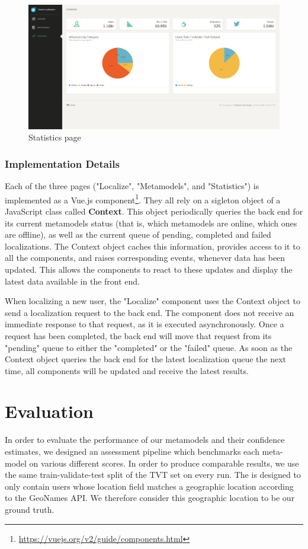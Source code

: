 \documentclass[10pt,a4paper]{article}
\begin{document}
\begin{figure}
	\centering
	\includegraphics[scale=0.20]{statistics}
	\caption{Statistics page}
	\label{fig:statistics}
\end{figure}

\subsubsection{Implementation Details}
Each of the three pages ("Localize", "Metamodels", and "Statistics") is implemented as a Vue.js component\footnote{\href{https://vuejs.org/v2/guide/components.html}{https://vuejs.org/v2/guide/components.html}}. They all rely on a sigleton object of a JavaScript class called \textbf{Context}. This object periodically queries the back end for its current metamodels status (that is, which metamodels are online, which ones are offline), as well as the current queue of pending, completed and failed localizations. The Context object caches this information, provides access to it to all the components, and raises corresponding events, whenever data has been updated. This allows the components to react to these updates and display the latest data available in the front end.

When localizing a new user, the "Localize" component uses the Context object to send a localization request to the back end. The component does not receive an immediate response to that request, as it is executed asynchronously. Once a request has been completed, the back end will move that request from its "pending" queue to either the "completed" or the "failed" queue. As soon as the Context object queries the back end for the latest localization queue the next time, all components will be updated and receive the latest results.


\section{Evaluation}
In order to evaluate the performance of our metamodels and their confidence estimates, we designed an assessment pipeline which benchmarks each meta-model on various different scores. In order to produce comparable results, we use the same train-validate-test split of the TVT set on every run. The is designed to only contain users whose location field matches a geographic location according to the GeoNames API. We therefore consider this geographic location to be our ground truth.
\end{document}

